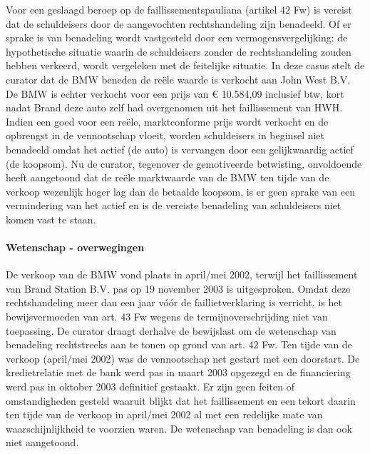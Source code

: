 \documentclass[
  dutch,
  a4paper,
]{article}
\begin{document}
Voor een geslaagd beroep op de faillissementspauliana (artikel 42 Fw) is vereist dat de schuldeisers door de aangevochten rechtshandeling zijn benadeeld. Of er sprake is van benadeling wordt vastgesteld door een vermogensvergelijking: de hypothetische situatie waarin de schuldeisers zonder de rechtshandeling zouden hebben verkeerd, wordt vergeleken met de feitelijke situatie. In deze casus stelt de curator dat de BMW beneden de reële waarde is verkocht aan John West B.V. De BMW is echter verkocht voor een prijs van € 10.584,09 inclusief btw, kort nadat Brand deze auto zelf had overgenomen uit het faillissement van HWH. Indien een goed voor een reële, marktconforme prijs wordt verkocht en de opbrengst in de vennootschap vloeit, worden schuldeisers in beginsel niet benadeeld omdat het actief (de auto) is vervangen door een gelijkwaardig actief (de koopsom). Nu de curator, tegenover de gemotiveerde betwisting, onvoldoende heeft aangetoond dat de reële marktwaarde van de BMW ten tijde van de verkoop wezenlijk hoger lag dan de betaalde koopsom, is er geen sprake van een vermindering van het actief en is de vereiste benadeling van schuldeisers niet komen vast te staan.

\paragraph{Wetenschap - overwegingen}\label{wetenschap---overwegingen-62}

De verkoop van de BMW vond plaats in april/mei 2002, terwijl het faillissement van Brand Station B.V. pas op 19 november 2003 is uitgesproken. Omdat deze rechtshandeling meer dan een jaar vóór de faillietverklaring is verricht, is het bewijsvermoeden van art. 43 Fw wegens de termijnoverschrijding niet van toepassing. De curator draagt derhalve de bewijslast om de wetenschap van benadeling rechtstreeks aan te tonen op grond van art. 42 Fw. Ten tijde van de verkoop (april/mei 2002) was de vennootschap net gestart met een doorstart. De kredietrelatie met de bank werd pas in maart 2003 opgezegd en de financiering werd pas in oktober 2003 definitief gestaakt. Er zijn geen feiten of omstandigheden gesteld waaruit blijkt dat het faillissement en een tekort daarin ten tijde van de verkoop in april/mei 2002 al met een redelijke mate van waarschijnlijkheid te voorzien waren. De wetenschap van benadeling is dan ook niet aangetoond.

\newpage

\end{document}
